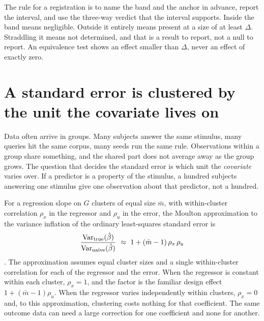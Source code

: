 The rule for a registration is to name the band and the anchor in advance, report the interval, and use the three-way verdict that the interval supports. Inside the band means negligible. Outside it entirely means present at a size of at least $\Delta$. Straddling it means not determined, and that is a result to report, not a null to report. An equivalence test shows an effect smaller than $\Delta$, never an effect of exactly zero.


\section{A standard error is clustered by the unit the covariate lives on}\label{sec:ch09:cluster}

Data often arrive in groups. Many subjects answer the same stimulus, many queries hit the same corpus, many seeds run the same rule. Observations within a group share something, and the shared part does not average away as the group grows. The question that decides the standard error is which unit the \emph{covariate} varies over. If a predictor is a property of the stimulus, a hundred subjects answering one stimulus give one observation about that predictor, not a hundred.

For a regression slope on $G$ clusters of equal size $\bar m$, with within-cluster correlation $\rho_x$ in the regressor and $\rho_u$ in the error, the Moulton approximation to the variance inflation of the ordinary least-squares standard error is
\begin{equation}
\frac{\Var_{\text{true}}(\hat\beta)}{\Var_{\text{naive}}(\hat\beta)}\ \approx\ 1+(\bar m-1)\,\rho_x\,\rho_u
\label{eq:ch09:moulton}
\end{equation}
\citep{cameronmiller2015}. The approximation assumes equal cluster sizes and a single within-cluster correlation for each of the regressor and the error. When the regressor is constant within each cluster, $\rho_x=1$, and the factor is the familiar design effect $1+(\bar m-1)\rho_u$. When the regressor varies independently within clusters, $\rho_x=0$ and, to this approximation, clustering costs nothing for that coefficient. The same outcome data can need a large correction for one coefficient and none for another.

